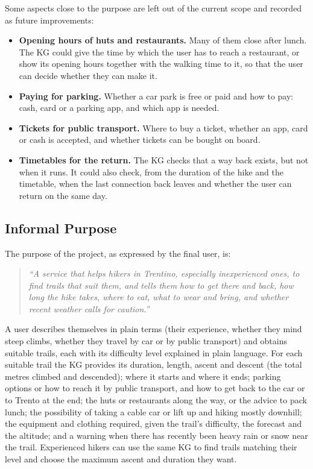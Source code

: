 \noindent Some aspects close to the purpose are left out of the current scope and recorded as future improvements:
\begin{itemize}
    \item \textbf{Opening hours of huts and restaurants.} Many of them close after lunch. The KG could give the time by which the user has to reach a restaurant, or show its opening hours together with the walking time to it, so that the user can decide whether they can make it.
    \item \textbf{Paying for parking.} Whether a car park is free or paid and how to pay: cash, card or a parking app, and which app is needed.
    \item \textbf{Tickets for public transport.} Where to buy a ticket, whether an app, card or cash is accepted, and whether tickets can be bought on board.
    \item \textbf{Timetables for the return.} The KG checks that a way back exists, but not when it runs. It could also check, from the duration of the hike and the timetable, when the last connection back leaves and whether the user can return on the same day.
\end{itemize}

\subsection{Informal Purpose}
\label{sec:informal-purpose}
The purpose of the project, as expressed by the final user, is:

\begin{quote}
\emph{``A service that helps hikers in Trentino, especially inexperienced ones, to find trails that suit them, and tells them how to get there and back, how long the hike takes, where to eat, what to wear and bring, and whether recent weather calls for caution.''}
\end{quote}

\noindent A user describes themselves in plain terms (their experience, whether they mind steep climbs, whether they travel by car or by public transport) and obtains suitable trails, each with its difficulty level explained in plain language. For each suitable trail the KG provides its duration, length, ascent and descent (the total metres climbed and descended); where it starts and where it ends; parking options or how to reach it by public transport, and how to get back to the car or to Trento at the end; the huts or restaurants along the way, or the advice to pack lunch; the possibility of taking a cable car or lift up and hiking mostly downhill; the equipment and clothing required, given the trail's difficulty, the forecast and the altitude; and a warning when there has recently been heavy rain or snow near the trail. Experienced hikers can use the same KG to find trails matching their level and choose the maximum ascent and duration they want.
